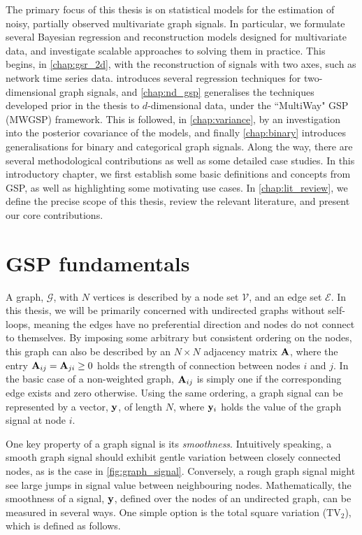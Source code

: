 The primary focus of this thesis is on statistical models for the estimation of noisy, partially observed multivariate graph signals. In particular, we formulate several Bayesian regression and reconstruction models designed for multivariate data, and investigate scalable approaches to solving them in practice. This begins, in \cref{chap:gsr_2d}, with the reconstruction of signals with two axes, such as network time series data.  introduces several regression techniques for two-dimensional graph signals, and \cref{chap:nd_gsp} generalises the techniques developed prior in the thesis to $d$-dimensional data, under the ``MultiWay" GSP (MWGSP) framework. This is followed, in \cref{chap:variance}, by an investigation into the posterior covariance of the models, and finally \cref{chap:binary} introduces generalisations for binary and categorical graph signals. Along the way, there are several methodological contributions as well as some detailed case studies. In this introductory chapter, we first establish some basic definitions and concepts from GSP, as well as highlighting some motivating use cases. In \cref{chap:lit_review}, we define the precise scope of this thesis, review the relevant literature, and present our core contributions. 


\section{GSP fundamentals}

\label{sec:fundamentals}

A graph, $\mathcal{G}$, with $N$ vertices is described by a node set $\mathcal{V}$, and an edge set $\mathcal{E}$. In this thesis, we will be primarily concerned with undirected graphs without self-loops, meaning the edges have no preferential direction and nodes do not connect to themselves. By imposing some arbitrary but consistent ordering on the nodes, this graph can also be described by an $N \times N$ adjacency matrix $\mathbf{A}$, where the entry $\mathbf{A}_{ij} = \mathbf{A}_{ji} \geq 0$ holds the strength of connection between nodes $i$ and $j$. In the basic case of a non-weighted graph, $\mathbf{A}_{ij}$ is simply one if the corresponding edge exists and zero otherwise. Using the same ordering, a graph signal can be represented by a vector, $\mathbf{y}$, of length $N$, where $\mathbf{y}_i$ holds the value of the graph signal at node $i$. 

One key property of a graph signal is its \textit{smoothness}. Intuitively speaking, a smooth graph signal should exhibit gentle variation between closely connected nodes, as is the case in \cref{fig:graph_signal}. Conversely, a rough graph signal might see large jumps in signal value between neighbouring nodes. Mathematically, the smoothness of a signal, $\mathbf{y}$, defined over the nodes of an undirected graph, can be measured in several ways. One simple option is the total square variation ($\text{TV}_2$), which is defined as follows. 

